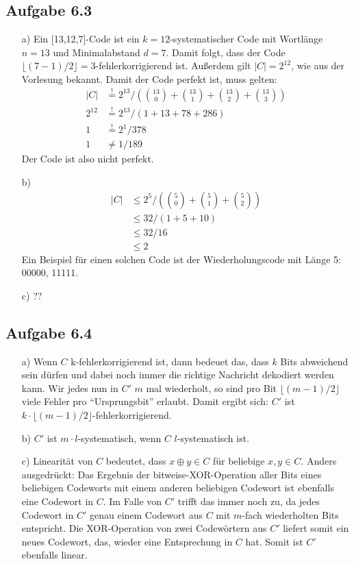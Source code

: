 \documentclass{article}
\begin{document}
    \subsection*{Aufgabe 6.3}
    \begin{enumerate}
        \item[a)] Ein [13,12,7]-Code ist ein $k=12$-systematischer Code mit Wortlänge $n=13$ und Minimalabstand $d=7$. Damit folgt, dass der Code $\lfloor(7-1)/2\rfloor = 3$-fehlerkorrigierend ist. Außerdem gilt $|C| = 2^12$, wie aus der Vorlesung bekannt. 
        Damit der Code perfekt ist, muss gelten:
        \begin{align*}
            |C| &\stackrel{!}{=} 2^{13} / \left(\binom{13}{0} + \binom{13}{1} + \binom{13}{2} + \binom{13}{3}\right) \\
            2^12 &\stackrel{!}{=} 2^{13} / (1 + 13 + 78 + 286) \\
            1 &\stackrel{!}{=} 2^{1} / 378\\
            1 &\neq 1 / 189
        \end{align*}
        Der Code ist also nicht perfekt. 
        \item[b)]
        \begin{align*}
            |C| &\le 2^5 / \left(\binom{5}{0} + \binom{5}{1} + \binom{5}{2}\right) \\
            &\le 32 / (1 + 5 + 10) \\
            &\le 32 / 16 \\
            &\le 2
        \end{align*}
        Ein Beispiel für einen solchen Code ist der Wiederholungscode mit Länge 5: {00000, 11111}.
        \item[c)] ??
    \end{enumerate}



    \subsection*{Aufgabe 6.4}
    \begin{enumerate}
        \item[a)] Wenn $C$ k-fehlerkorrigierend ist, dann bedeuet das, dass $k$ Bits abweichend sein dürfen und dabei noch immer die richtige Nachricht dekodiert werden kann. Wir jedes nun in $C'$ $m$ mal wiederholt, so sind pro Bit $\lfloor(m-1)/2\rfloor$ viele Fehler pro "`Ursprungsbit"' erlaubt. Damit ergibt sich: $C'$ ist $k\cdot \lfloor(m-1)/2\rfloor$-fehlerkorrigierend. 
        \item[b)] $C'$ ist $m\cdot l$-systematisch, wenn $C$ $l$-systematisch ist.
        \item[c)] Linearität von $C$ bedeutet, dass $x \oplus y \in C$ für beliebige $x, y \in C$. Anders ausgedrückt: Das Ergebnis der bitweise-XOR-Operation aller Bits eines beliebigen Codeworts mit einem anderen beliebigen Codewort ist ebenfalls eine Codewort in $C$. Im Falle von $C'$ trifft das immer noch zu, da jedes Codewort in $C'$ genau einem Codewort aus $C$ mit $m$-fach wiederholten Bits entspricht. Die XOR-Operation von zwei Codewörtern aus $C'$ liefert somit ein neues Codewort, das, wieder eine Entsprechung in $C$ hat. Somit ist $C'$ ebenfalls linear. 
    \end{enumerate}
\end{document}
